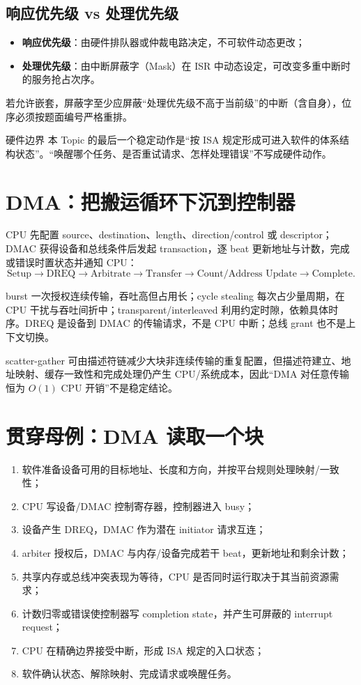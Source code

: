 \documentclass[UTF8,fontset=fandol,11pt,a4paper]{ctexart}
\newcommand{\kw}[1]{\textbf{\color{deep}#1}}
\begin{document}
\subsection{响应优先级 vs 处理优先级}
\begin{itemize}
  \item \kw{响应优先级}：由硬件排队器或仲裁电路决定，不可软件动态更改；
  \item \kw{处理优先级}：由中断屏蔽字（Mask）在 ISR 中动态设定，可改变多重中断时的服务抢占次序。
\end{itemize}
若允许嵌套，屏蔽字至少应屏蔽“处理优先级不高于当前级”的中断（含自身），位序必须按题面编号严格重排。

\begin{methodbox}{硬件边界}
本 Topic 的最后一个稳定动作是“按 ISA 规定形成可进入软件的体系结构状态”。“唤醒哪个任务、是否重试请求、怎样处理错误”不写成硬件动作。
\end{methodbox}

\section{DMA：把搬运循环下沉到控制器}
CPU 先配置 source、destination、length、direction/control 或 descriptor；DMAC 获得设备和总线条件后发起 transaction，逐 beat 更新地址与计数，完成或错误时置状态并通知 CPU：
\[
\text{Setup}\to\text{DREQ}\to\text{Arbitrate}\to\text{Transfer}\to\text{Count/Address Update}\to\text{Complete}.
\]

burst 一次授权连续传输，吞吐高但占用长；cycle stealing 每次占少量周期，在 CPU 干扰与吞吐间折中；transparent/interleaved 利用约定时隙，依赖具体时序。DREQ 是设备到 DMAC 的传输请求，不是 CPU 中断；总线 grant 也不是上下文切换。

scatter-gather 可由描述符链减少大块非连续传输的重复配置，但描述符建立、地址映射、缓存一致性和完成处理仍产生 CPU/系统成本，因此“DMA 对任意传输恒为 $O(1)$ CPU 开销”不是稳定结论。

\section{贯穿母例：DMA 读取一个块}
\begin{enumerate}
\item 软件准备设备可用的目标地址、长度和方向，并按平台规则处理映射/一致性；
\item CPU 写设备/DMAC 控制寄存器，控制器进入 busy；
\item 设备产生 DREQ，DMAC 作为潜在 initiator 请求互连；
\item arbiter 授权后，DMAC 与内存/设备完成若干 beat，更新地址和剩余计数；
\item 共享内存或总线冲突表现为等待，CPU 是否同时运行取决于其当前资源需求；
\item 计数归零或错误使控制器写 completion state，并产生可屏蔽的 interrupt request；
\item CPU 在精确边界接受中断，形成 ISA 规定的入口状态；
\item 软件确认状态、解除映射、完成请求或唤醒任务。
\end{enumerate}
\end{document}
